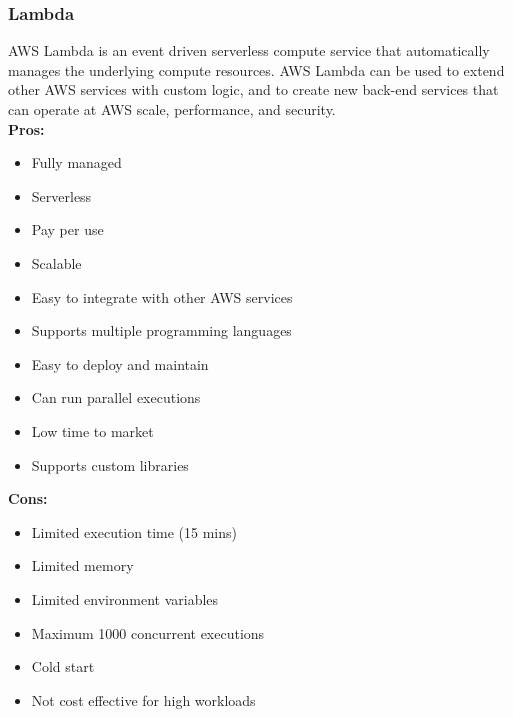         \subsubsection{Lambda}
        \label{aws:lambda}
        AWS Lambda is an event driven serverless compute service that automatically manages the underlying compute resources.
        AWS Lambda can be used to extend other AWS services with custom logic, and to create new back-end services that can
        operate at AWS scale, performance, and security.\\
        \textbf{Pros:}
        \begin{itemize}
            \item Fully managed
            \item Serverless
            \item Pay per use
            \item Scalable
            \item Easy to integrate with other AWS services
            \item Supports multiple programming languages
            \item Easy to deploy and maintain
            \item Can run parallel executions
            \item Low time to market
            \item Supports custom libraries
        \end{itemize}
        \textbf{Cons:}
        \begin{itemize}
            \item Limited execution time (15 mins)
            \item Limited memory
            \item Limited environment variables
            \item Maximum 1000 concurrent executions
            \item Cold start
            \item Not cost effective for high workloads
        \end{itemize}

